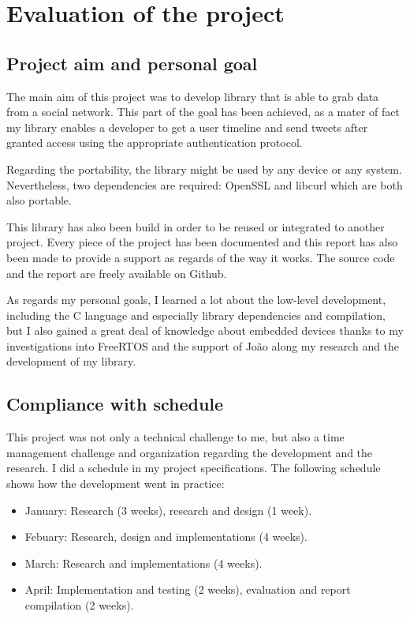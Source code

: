 \chapter{Evaluation of the project}


\section{Project aim and personal goal}

\hspace{15mm}The main aim of this project was to develop library that is able to grab data from a social network. This part of the goal has been achieved, as a mater of fact my library enables a developer to get a user timeline and send tweets after granted access using the appropriate authentication protocol.

Regarding the portability, the library might be used by any device or any system. Nevertheless, two dependencies are required: OpenSSL and libcurl which are both also portable.

This library has also been build in order to be reused or integrated to another project. Every piece of the project has been documented and this report has also been made to provide a support as regards of the way it works. The source code and the report are freely available on Github.

As regards my personal goals, I learned a lot about the low-level development, including the C language and especially library dependencies and compilation, but I also gained a great deal of knowledge about embedded devices thanks to my investigations into FreeRTOS and the support of Jo\~{a}o along my research and the development of my library.


\section{Compliance with schedule}

\hspace{15mm}This project was not only a technical challenge to me, but also a time management challenge and organization regarding the development and the research. I did a schedule in my project specifications. The following schedule shows how the development went in practice:
\begin{itemize}
\item January: Research (3 weeks), research and design (1 week).
\item Febuary: Research, design and implementations (4 weeks).
\item March: Research and implementations (4 weeks).
\item April: Implementation and testing (2 weeks), evaluation and report compilation (2 weeks).
\end{itemize}

